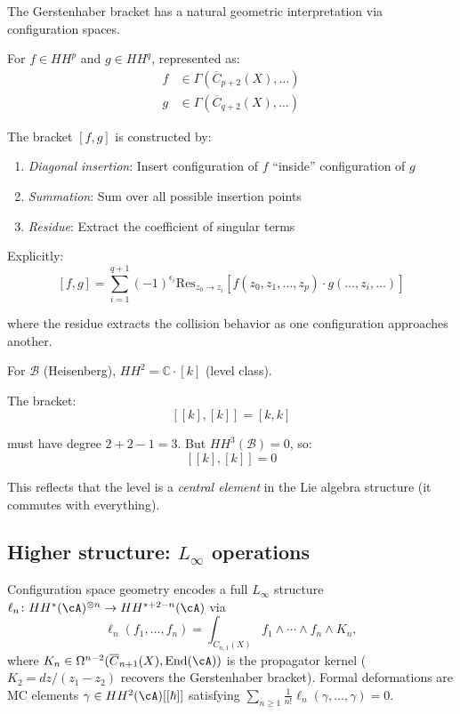 \begin{construction}\label{const:gerstenhaber-bracket}
The Gerstenhaber bracket has a natural geometric interpretation via configuration spaces.

For $f \in HH^p$ and $g \in HH^q$, represented as:
\begin{align*}
f &\in \Gamma(\overline{C}_{p+2}(X), \ldots)\\
g &\in \Gamma(\overline{C}_{q+2}(X), \ldots)
\end{align*}

The bracket $[f, g]$ is constructed by:
\begin{enumerate}
\item \emph{Diagonal insertion}: Insert configuration of $f$ ``inside'' configuration of $g$
\item \emph{Summation}: Sum over all possible insertion points
\item \emph{Residue}: Extract the coefficient of singular terms
\end{enumerate}

Explicitly:
\[[f, g] = \sum_{i=1}^{q+1} (-1)^{\epsilon_i} \text{Res}_{z_0 \to z_i}\left[f(z_0, z_1, \ldots, z_p) 
\cdot g(\ldots, z_i, \ldots)\right]\]

where the residue extracts the collision behavior as one configuration approaches another.
\end{construction}

\begin{example}\label{ex:gerstenhaber-heisenberg}
For $\mathcal{B}$ (Heisenberg), $HH^2 = \mathbb{C} \cdot [k]$ (level class).

The bracket:
\[[[k], [k]] = [k, k]\]

must have degree $2 + 2 - 1 = 3$. But $HH^3(\mathcal{B}) = 0$, so:
\[[[k], [k]] = 0\]

This reflects that the level is a \emph{central element} in the Lie algebra structure
(it commutes with everything).
\end{example}

\subsection{\texorpdfstring{Higher structure: $L_\infty$ operations}{Higher structure: L-infinity operations}}

\begin{remark}\label{rem:L-infty-structure}
Configuration space geometry encodes a full $L_\infty$ structure
$\ell_n\colon HH^*(\cA)^{\otimes n} \to HH^{*+2-n}(\cA)$ via
\[
\ell_n(f_1, \ldots, f_n) = \int_{C_{n,1}(X)} f_1 \wedge \cdots \wedge f_n
\wedge K_n,
\]
where $K_n \in \Omega^{n-2}(\overline{C}_{n+1}(X), \mathrm{End}(\cA))$
is the propagator kernel ($K_2 = dz/(z_1-z_2)$ recovers the Gerstenhaber
bracket).  Formal deformations are MC elements
$\gamma \in HH^2(\cA)[[\hbar]]$ satisfying
$\sum_{n \geq 1} \frac{1}{n!}\ell_n(\gamma, \ldots, \gamma) = 0$.
\end{remark}

